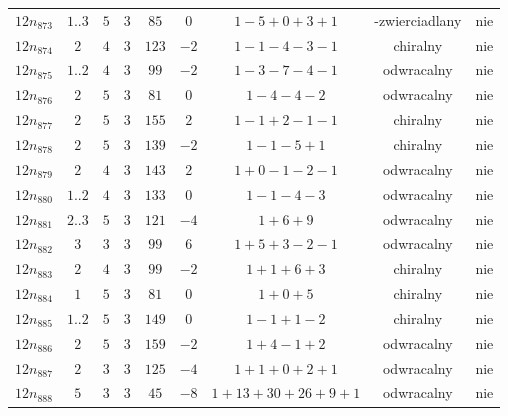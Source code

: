 \begin{longtable}{ccccccccc}
$12n_{873}$ & $1..3$ & $5$ & $3$ & $85$ & $0$ & $1-5+0+3+1$ & -zwierciadlany & nie \\
$12n_{874}$ & $2$ & $4$ & $3$ & $123$ & $-2$ & $1-1-4-3-1$ & chiralny & nie \\
$12n_{875}$ & $1..2$ & $4$ & $3$ & $99$ & $-2$ & $1-3-7-4-1$ & odwracalny & nie \\
$12n_{876}$ & $2$ & $5$ & $3$ & $81$ & $0$ & $1-4-4-2$ & odwracalny & nie \\
$12n_{877}$ & $2$ & $5$ & $3$ & $155$ & $2$ & $1-1+2-1-1$ & chiralny & nie \\
$12n_{878}$ & $2$ & $5$ & $3$ & $139$ & $-2$ & $1-1-5+1$ & chiralny & nie \\
$12n_{879}$ & $2$ & $4$ & $3$ & $143$ & $2$ & $1+0-1-2-1$ & odwracalny & nie \\
$12n_{880}$ & $1..2$ & $4$ & $3$ & $133$ & $0$ & $1-1-4-3$ & odwracalny & nie \\
$12n_{881}$ & $2..3$ & $5$ & $3$ & $121$ & $-4$ & $1+6+9$ & odwracalny & nie \\
$12n_{882}$ & $3$ & $3$ & $3$ & $99$ & $6$ & $1+5+3-2-1$ & odwracalny & nie \\
$12n_{883}$ & $2$ & $4$ & $3$ & $99$ & $-2$ & $1+1+6+3$ & chiralny & nie \\
$12n_{884}$ & $1$ & $5$ & $3$ & $81$ & $0$ & $1+0+5$ & chiralny & nie \\
$12n_{885}$ & $1..2$ & $5$ & $3$ & $149$ & $0$ & $1-1+1-2$ & chiralny & nie \\
$12n_{886}$ & $2$ & $5$ & $3$ & $159$ & $-2$ & $1+4-1+2$ & odwracalny & nie \\
$12n_{887}$ & $2$ & $3$ & $3$ & $125$ & $-4$ & $1+1+0+2+1$ & odwracalny & nie \\
$12n_{888}$ & $5$ & $3$ & $3$ & $45$ & $-8$ & $1+13+30+26+9+1$ & odwracalny & nie \\
\hline
\end{longtable}
\normalsize

